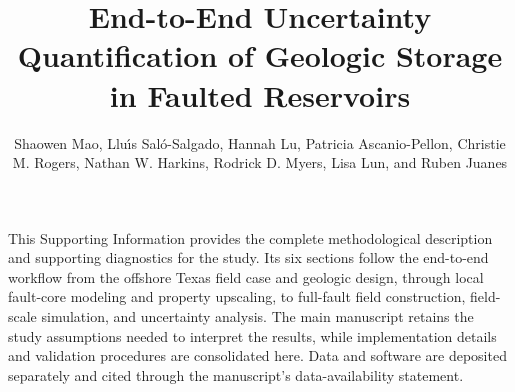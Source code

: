 \documentclass[9pt,twoside]{pnas-new}
\title{End-to-End Uncertainty Quantification of Geologic \coTwo{} Storage in Faulted Reservoirs}
\author{Shaowen Mao, Llu\'{\i}s Sal\'o-Salgado, Hannah Lu, Patricia Ascanio-Pellon, Christie M. Rogers, Nathan W. Harkins, Rodrick D. Myers, Lisa Lun, and Ruben Juanes}
\begin{document}
\maketitle
\SItext

This Supporting Information provides the complete methodological description
and supporting diagnostics for the study. Its six sections follow the
end-to-end workflow from the offshore Texas field case and geologic design,
through local fault-core modeling and property upscaling, to full-fault field
construction, field-scale simulation, and uncertainty analysis. The main
manuscript retains the study assumptions needed to interpret the results,
while implementation details and validation procedures are consolidated here.
Data and software are deposited separately and cited through the manuscript's
data-availability statement.

\setcounter{section}{0}
\setcounter{subsection}{0}
\renewcommand{\thesection}{\arabic{section}}
\renewcommand{\thesubsection}{\Alph{subsection}}









\end{document}
